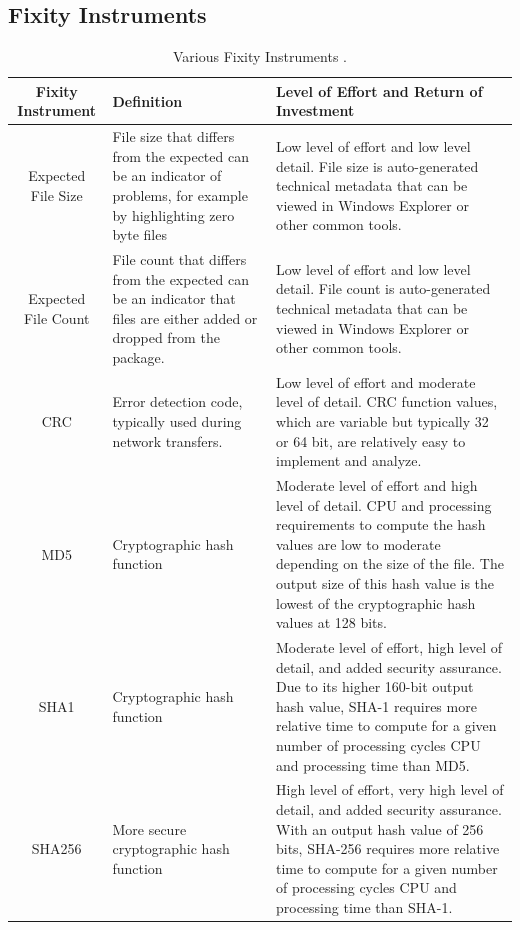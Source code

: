 \documentclass[final]{vutinfth}
\begin{document}
\subsection{Fixity Instruments}
\begin{table}[p]
    \centering
    \begin{tabular}{c|p{}|p{}}
      Fixity Instrument & Definition & Level of Effort and Return of Investment\\
      \hline
      Expected File Size & File size that differs from the expected can be an indicator of problems, for example by highlighting zero byte files & Low level of effort and low level detail. File size is auto-generated technical metadata that can be viewed in Windows Explorer or other common tools. \\  
      \hline
      Expected File Count & File count that differs from the expected can be an indicator that files are either added or dropped from the package. & Low level of effort and low level detail. File count is auto-generated technical metadata that can be viewed in Windows Explorer or other common tools.  \\
     \hline
     CRC & Error detection code, typically used during network transfers. & Low level of effort and moderate level of detail. CRC function values, which are variable but typically 32 or 64 bit, are relatively easy to implement and analyze.  \\
     \hline
     MD5 & Cryptographic hash function & Moderate level of effort and high level of detail. CPU and processing requirements to compute the hash values are low to moderate depending on the size of the file. The output size of this hash value is the lowest of the cryptographic hash values at 128 bits.  \\
     \hline
     SHA1 & Cryptographic hash function & Moderate level of effort, high level of detail, and added security assurance. Due to its higher 160-bit output hash value, SHA-1 requires more relative time to compute for a given number of processing cycles CPU and processing time than MD5.  \\
     \hline
     SHA256 & More secure cryptographic hash function & High level of effort, very high level of detail, and added security assurance. With an output hash value of 256 bits, SHA-256 requires more relative time to compute for a given number of processing cycles CPU and processing time than SHA-1. 
    \end{tabular}
    \caption{Various Fixity Instruments \cite[6]{ndsa2017fixity}.}
    \label{tb:fixity-instruments}
\end{table}
\end{document}
